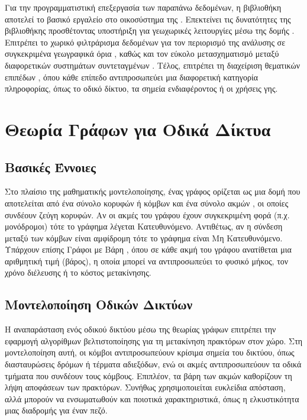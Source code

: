 Για την προγραμματιστική επεξεργασία των παραπάνω δεδομένων, η
βιβλιοθήκη  αποτελεί το βασικό εργαλείο στο
οικοσύστημα της . Επεκτείνει τις δυνατότητες της
βιβλιοθήκης  προσθέτοντας υποστήριξη για γεωχωρικές
λειτουργίες μέσω της δομής . Επιτρέπει το
χωρικό φιλτράρισμα δεδομένων  για τον
περιορισμό της ανάλυσης σε συγκεκριμένα γεωγραφικά όρια
, καθώς και τον εύκολο μετασχηματισμό μεταξύ
διαφορετικών συστημάτων συντεταγμένων . Τέλος,
επιτρέπει τη διαχείριση θεματικών επιπέδων , όπου
κάθε επίπεδο αντιπροσωπεύει μια διαφορετική κατηγορία πληροφορίας,
όπως το οδικό δίκτυο, τα σημεία ενδιαφέροντος ή οι χρήσεις γης.


\section{Θεωρία Γράφων για Οδικά Δίκτυα}

\subsection{Βασικές Έννοιες}

Στο πλαίσιο της μαθηματικής μοντελοποίησης, ένας γράφος
 ορίζεται ως μια δομή που αποτελείται από ένα
σύνολο κορυφών ή κόμβων  και ένα σύνολο ακμών
, οι οποίες συνδέουν ζεύγη κορυφών. Αν οι ακμές του
γράφου έχουν συγκεκριμένη φορά (π.χ. μονόδρομοι) τότε το γράφημα
λέγεται Κατευθυνόμενο. Αντιθέτως, αν η σύνδεση μεταξύ των κόμβων
είναι αμφίδρομη τότε το γράφημα είναι Μη Κατευθυνόμενο. Υπάρχουν
επίσης Γράφοι με Βάρη , όπου σε κάθε ακμή
του γράφου ανατίθεται μια αριθμητική τιμή (βάρος), η οποία μπορεί
να αντιπροσωπεύει το φυσικό μήκος, τον χρόνο διέλευσης ή το
κόστος μετακίνησης.

\subsection{Μοντελοποίηση Οδικών Δικτύων}

Η αναπαράσταση ενός οδικού δικτύου μέσω της θεωρίας γράφων
επιτρέπει την εφαρμογή αλγορίθμων βελτιστοποίησης για τη
μετακίνηση πρακτόρων στον χώρο. Στη μοντελοποίηση αυτή, οι κόμβοι
αντιπροσωπεύουν κρίσιμα σημεία του δικτύου, όπως διασταυρώσεις
δρόμων ή τέρματα αδιεξόδων, ενώ οι ακμές αντιπροσωπεύουν τα οδικά
τμήματα που συνδέουν τους κόμβους. Επιπλέον, τα βάρη των ακμών
καθορίζουν τη λήψη αποφάσεων των πρακτόρων. Συνήθως
χρησιμοποιείται ευκλείδια απόσταση, αλλά μπορούν να ενσωματωθούν
και ποιοτικά χαρακτηριστικά, όπως η ελκυστικότητα μιας διαδρομής
για έναν πεζό.

